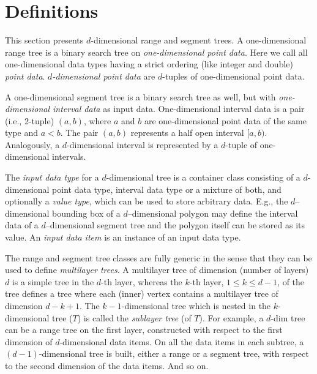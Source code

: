 \section{Definitions}
This section presents $d$-dimensional range and segment trees.
A one-dimensional range tree is a binary search tree on 
{\em{one-dimensional point data}}. 
Here we call all one-dimensional data types having a strict ordering
(like integer and double) {\em point data}. 
{\em{$d$-dimensional point data}} are $d$-tuples of one-dimensional 
point data.

A one-dimensional segment tree is a binary search tree as well, but with
{\em{one-dimensional interval data}} as input data.
One-dimensional interval data is a pair (i.e., 2-tuple) $(a,b)$, where $a$ 
and $b$ are one-dimensional point data of the same type and $a< b$. 
The pair $(a,b)$ represents a half open interval $[a,b)$.
Analogously, a $d$-dimensional interval  is represented by a $d$-tuple of
one-dimensional intervals.

The {\em{input data type}} for a $d$-dimensional tree is a container 
class consisting of a $d$-dimensional point data type, interval data type 
or a mixture of both, and optionally a {\em{value type}}, which 
can be used to store arbitrary data. 
E.g., the $d$--dimensional bounding box of a $d$--dimensional polygon 
may define the interval data of a $d$--dimensional segment tree and
the polygon itself can be stored as its value.   
An {\em{input data item}} is an instance of an input data type.

The range and segment tree classes are fully generic in the sense that they 
can be used to define {\em{multilayer trees}}. 
A multilayer tree of dimension (number of layers) $d$ is a simple tree in 
the $d$-th layer, whereas the $k$-th layer, $1\leq k\leq d-1$, of the tree 
defines a tree where each (inner) vertex contains a multilayer tree of 
dimension $d-k+1$.
The $k-1$-dimensional tree which is nested in the $k$-dimensional tree 
($T$) is called the {\em sublayer tree} (of $T$).
For example, a $d$-dim tree can be a range tree on the first layer, 
constructed with respect to the first dimension of $d$-dimensional data 
items.
On all the data items in each subtree, a $(d-1)$-dimensional tree is built,
either a range or a segment tree, with respect to the second dimension of 
the data items.
And so on.

